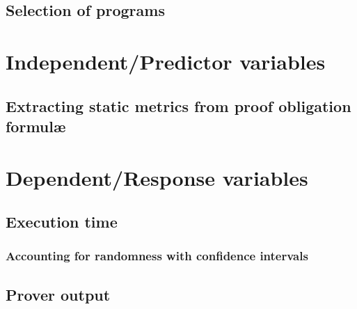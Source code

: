 \subsection{Selection of \why programs}

\section{Independent/Predictor variables}
\subsection{Extracting static metrics from \why proof obligation formul\ae}
\label{sub:extracting}

\section{Dependent/Response variables}
\subsection{Execution time}
\subsubsection{Accounting for randomness with confidence intervals}
\subsection{Prover output}





